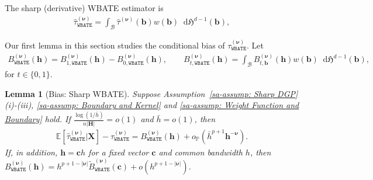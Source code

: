 \documentclass[10pt]{article}
\newtheorem{lem}{Lemma}
\renewcommand{\P}{\mathbb{P}}
\newcommand{\E}{\mathbb{E}}
\newcommand{\Haus}{\mathfrak{H}}
\newcommand{\dif}{\mathop{}\!\mathrm{d}}
\newcommand{\bb}{\mathbf{b}}
\newcommand{\bc}{\mathbf{c}}
\newcommand{\bh}{\mathbf{h}}
\newcommand{\bH}{\mathbf{H}}
\newcommand{\bX}{\mathbf{X}}
\newcommand{\bnu}{\boldsymbol{\nu}}
\newcommand{\B}{\mathcal{B}}
\begin{document}
The sharp (derivative) WBATE estimator is
\begin{align*}
    \widehat{\tau}_{\mathtt{WBATE}}^{(\bnu)} = \int_\B \widehat{\tau}^{(\bnu)}(\bb) w(\bb) \dif\Haus^{d-1}(\bb),
\end{align*}

Our first lemma in this section studies the conditional bias of $\tau_{\mathtt{WBATE}}^{(\bnu)}$. Let
\begin{align*}
    B_{\mathtt{WBATE}}^{(\bnu)}(\bh) = B_{1,\mathtt{WBATE}}^{(\bnu)}(\bh) - B_{0,\mathtt{WBATE}}^{(\bnu)}(\bh),
    \qquad
    B_{t,\mathtt{WBATE}}^{(\bnu)}(\bh) = \int_{\B} B^{(\bnu)}_{t,\bb}(\bh) w(\bb) \dif\Haus^{d-1}(\bb),
\end{align*}
for $t\in\{0,1\}$.

\begin{lem}[Bias: Sharp WBATE]\label{sa-lem: Bias: Sharp WBATE}
    Suppose Assumption~\ref{sa-assump: Sharp DGP}(i)-(iii), \ref{sa-assump: Boundary and Kernel} and \ref{sa-assump: Weight Function and Boundary} hold. If $\frac{\log(1/\bar{h})}{n |\bH|} = o(1)$ and $\bar{h} = o(1)$, then
    \begin{align*}
        \E[\widehat{\tau}_{\mathtt{WBATE}}^{(\bnu)}|\bX] - \tau_{\mathtt{WBATE}}^{(\bnu)} = B_{\mathtt{WBATE}}^{(\bnu)}(\bh) + o_{\P}(\bar{h}^{p+1}\bh^{-\bnu}).
    \end{align*}
    If, in addition, $\bh = \bc h$ for a fixed vector $\bc$ and common bandwidth $h$, then $B_{\mathtt{WBATE}}^{(\bnu)}(\bh) = h^{p+1-|\bnu|}\widetilde{B}_{\mathtt{WBATE}}^{(\bnu)}(\bc) + o(h^{p+1-|\bnu|})$.
\end{lem}
\end{document}
